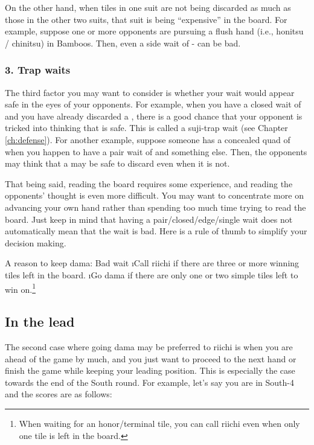 \bigskip
On the other hand, when tiles in one suit are not being discarded as much as those in the other two suits, that suit is being ``expensive'' in the board. For example, suppose one or more opponents are pursuing a flush hand (i.e., {\jap honitsu} / {\jap chinitsu}) in Bamboos. Then, even a side wait of {\large {}-} can be bad. 

\subsubsection{3. Trap waits}

The third factor you may want to consider is whether your wait would appear safe in the eyes of your opponents. For example, when you have a closed wait of {\large{}} and you have already discarded a {\large{}}, there is a good chance that your opponent is tricked into thinking that {\large{}} is safe. This is called a {\jap suji}-trap wait (see Chapter \ref{ch:defense}). 
For another example, suppose someone has a concealed quad of {\large{}} when you happen to have a pair wait of {\large{}} and something else. Then, the opponents may think that a {\large{}} may be safe to discard even when it is not. 

\bigskip
That being said, reading the board requires some experience, and reading the opponents' thought is even more difficult. You may want to concentrate more on advancing your own hand rather than spending too much time trying to read the board. Just keep in mind that having a pair/closed/edge/single wait does not automatically mean that the wait is bad. Here is a rule of thumb to simplify your decision making.

\bigskip
\begin{itembox}[c]{A reason to keep {\jap dama}: Bad wait}
\bi
\i Call {\jap riichi} if there are three or more winning tiles left in the board.
\i Go {\jap dama} if there are only one or two simple tiles left to win on.\footnote{When waiting for an honor/terminal tile, you can call {\jap riichi} even when only one tile is left in the board.}
\ei \vsps
\end{itembox}

\subsection{In the lead}\label{sec:lead}
The second case where going {\jap dama} may be preferred to {\jap riichi} is when you are ahead of the game by much, and you just want to proceed to the next hand or finish the game while keeping your leading position. This is especially the case towards the end of the South round. For example, let's say you are in South-4 and the scores are as follows:

